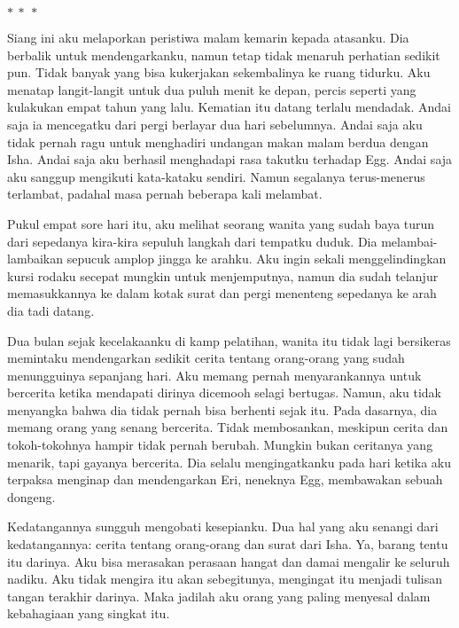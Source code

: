 \documentclass[smalldemyvopaper,11pt,twoside,onecolumn,openright,extrafontsizes]{memoir}
\newcommand\separator{
  \begin{center}
    \(\ast~\ast~\ast\)
  \end{center}
}
\begin{document}
\separator{}

Siang ini aku melaporkan peristiwa malam kemarin kepada atasanku. Dia berbalik untuk mendengarkanku, namun tetap tidak menaruh perhatian sedikit pun. Tidak banyak yang bisa kukerjakan sekembalinya ke ruang tidurku. Aku menatap langit-langit untuk dua puluh menit ke depan, percis seperti yang kulakukan empat tahun yang lalu. Kematian itu datang terlalu mendadak. Andai saja ia mencegatku dari pergi berlayar dua hari sebelumnya. Andai saja aku tidak pernah ragu untuk menghadiri undangan makan malam berdua dengan Isha. Andai saja aku berhasil menghadapi rasa takutku terhadap Egg. Andai saja aku sanggup mengikuti kata-kataku sendiri. Namun segalanya terus-menerus terlambat, padahal masa pernah beberapa kali melambat.


Pukul empat sore hari itu, aku melihat seorang wanita yang sudah baya turun dari sepedanya kira-kira sepuluh langkah dari tempatku duduk. Dia melambai-lambaikan sepucuk amplop jingga ke arahku. Aku ingin sekali menggelindingkan kursi rodaku secepat mungkin untuk menjemputnya, namun dia sudah telanjur memasukkannya ke dalam kotak surat dan pergi menenteng sepedanya ke arah dia tadi datang.


Dua bulan sejak kecelakaanku di kamp pelatihan, wanita itu tidak lagi bersikeras memintaku mendengarkan sedikit cerita tentang orang-orang yang sudah menungguinya sepanjang hari. Aku memang pernah menyarankannya untuk bercerita ketika mendapati dirinya dicemooh selagi bertugas. Namun, aku tidak menyangka bahwa dia tidak pernah bisa berhenti sejak itu. Pada dasarnya, dia memang orang yang senang bercerita. Tidak membosankan, meskipun cerita dan tokoh-tokohnya hampir tidak pernah berubah. Mungkin bukan ceritanya yang menarik, tapi gayanya bercerita. Dia selalu mengingatkanku pada hari ketika aku terpaksa menginap dan mendengarkan Eri, neneknya Egg, membawakan sebuah dongeng.


Kedatangannya sungguh mengobati kesepianku. Dua hal yang aku senangi dari kedatangannya: cerita tentang orang-orang dan surat dari Isha. Ya, barang tentu itu darinya. Aku bisa merasakan perasaan hangat dan damai mengalir ke seluruh nadiku. Aku tidak mengira itu akan sebegitunya, mengingat itu menjadi tulisan tangan terakhir darinya. Maka jadilah aku orang yang paling menyesal dalam kebahagiaan yang singkat itu.
\end{document}
